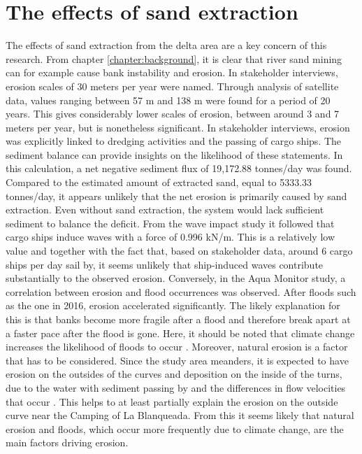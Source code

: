 \section{The effects of sand extraction}
The effects of sand extraction from the delta area are a key concern of this research. From chapter \ref{chapter:background}, it is clear that river sand mining can for example cause bank instability and erosion. In stakeholder interviews, erosion scales of 30 meters per year were named. Through analysis of satellite data, values ranging between 57 m and 138 m were found for a period of 20 years. This gives considerably lower scales of erosion, between around 3 and 7 meters per year, but is nonetheless significant. In stakeholder interviews, erosion was explicitly linked to dredging activities and the passing of cargo ships. The sediment balance can provide insights on the likelihood of these statements. In this calculation, a net negative sediment flux of 19,172.88 tonnes/day was found. Compared to the estimated amount of extracted sand, equal to 5333.33 tonnes/day, it appears unlikely that the net erosion is primarily caused by sand extraction. Even without sand extraction, the system would lack sufficient sediment to balance the deficit. From the wave impact study it followed that cargo ships induce waves with a force of 0.996 kN/m. This is a relatively low value and together with the fact that, based on stakeholder data, around 6 cargo ships per day sail by, it seems unlikely that ship-induced waves contribute substantially to the observed erosion. Conversely, in the Aqua Monitor study, a correlation between erosion and flood occurrences was observed. After floods such as the one in 2016, erosion accelerated significantly. The likely explanation for this is that banks become more fragile after a flood and therefore break apart at a faster pace after the flood is gone. Here, it should be noted that climate change increases the likelihood of floods to occur \autocite{usenvironmentalprotectionagencyClimateChangeIndicators2016}. Moreover, natural erosion is a factor that has to be considered. Since the study area meanders, it is expected to have erosion on the outsides of the curves and deposition on the inside of the turns, due to the water with sediment passing by and the differences in flow velocities that occur \autocite{niWhyRiversCurve2025}. This helps to at least partially explain the erosion on the outside curve near the Camping of La Blanqueada. From this it seems likely that natural erosion and floods, which occur more frequently due to climate change, are the main factors driving erosion.

